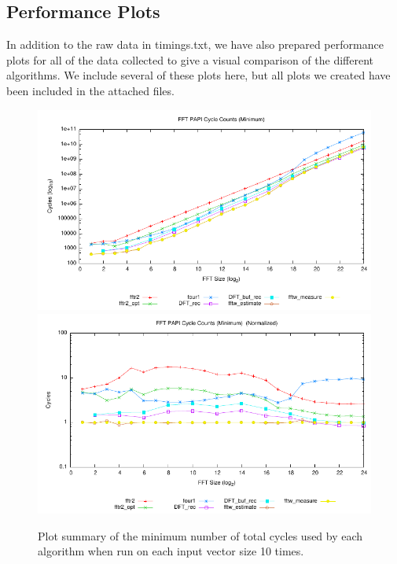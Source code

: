 \documentclass[11 pt]{article}
\begin{document}
\subsection{Performance Plots}
In addition to the raw data in timings.txt, we have also prepared performance
plots for all of the data collected to give a visual comparison of the
different algorithms.  We include several of these plots here, but all plots
we created have been included in the attached files.

\begin{figure}[htbp]
  \centering
	\includegraphics[width=\columnwidth]{../plots/tot_cyc_min}
	\includegraphics[width=\columnwidth]{../plots/tot_cyc_min_norm}
  \caption{Plot summary of the minimum number of total cycles used by each
	   algorithm when run on each input vector size 10 times.}
  \label{fig:cyc_min}
\end{figure}
\end{document}

